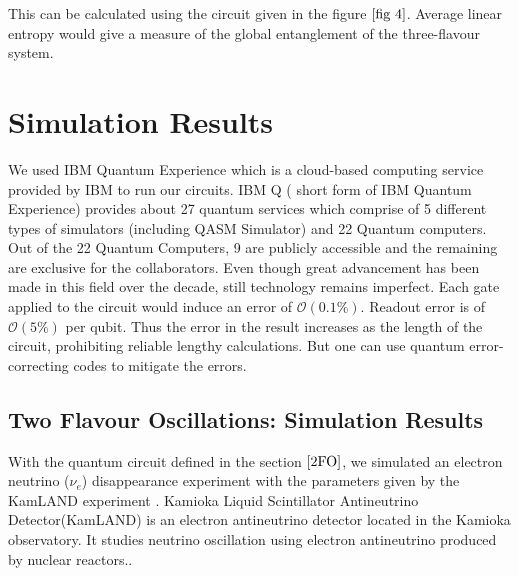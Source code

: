 \documentclass[12pt,a4paper]{report}
\begin{document}
This can be calculated using the circuit given in the figure $\ref{fig 4}$. Average linear entropy would give a measure of the global entanglement of the three-flavour system.

\newpage
\thispagestyle{empty}
\mbox{}
\newpage


\chapter{Simulation Results}\label{sec5}
We used IBM Quantum Experience which is a cloud-based computing service provided by IBM to run our circuits. IBM Q ( short form of IBM Quantum Experience) provides about 27 quantum services which comprise of 5 different types of simulators (including QASM Simulator) and 22 Quantum computers. Out of the 22 Quantum Computers, 9 are publicly accessible and the remaining are exclusive for the collaborators. Even though great advancement has been made in this field over the decade, still technology remains imperfect. Each gate applied to the circuit would induce an error of $\mathcal{O}(0.1\%)$. Readout error is of $\mathcal{O}(5\%)$ per qubit. Thus the error in the result increases as the length of the circuit, prohibiting reliable lengthy calculations. But one can use quantum error-correcting codes to mitigate the errors. 
\section{Two Flavour Oscillations: Simulation Results} 
With the quantum circuit defined in the section $\ref{2FO}$, we simulated an electron neutrino ($\nu_{e}$) disappearance experiment with the parameters given by the KamLAND experiment \cite{Eugichi}. Kamioka Liquid Scintillator Antineutrino Detector(KamLAND) is an electron antineutrino detector located in the Kamioka observatory. It studies neutrino oscillation using electron antineutrino produced by nuclear reactors.\cite{Iwamoto}.\par
\end{document}

